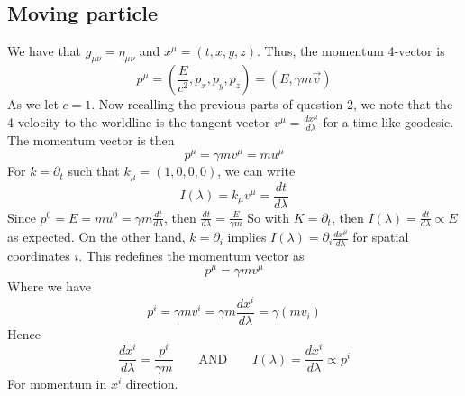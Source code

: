 \documentclass{article}
\begin{document}
		\subsection{Moving particle}
		We have that $g_{\mu\nu} = \eta_{\mu\nu}$ and $x^\mu = (t,x,y,z)$. Thus, the momentum 4-vector is
		$$ p^\mu = \left( \frac{E}{c^2}, p_x, p_y, p_z\right) = \left( E, \gamma m \vec{v}\right)$$
		As we let $c=1$. Now recalling the previous parts of question 2, we note that the 4 velocity to the worldline is the tangent vector $v^\mu = \frac{dx^\mu}{d\lambda}$ for a time-like geodesic. The momentum vector is then
		$$ p^\mu = \gamma m v^\mu = mu^\mu$$
		For $k = \partial_t $ such that $k_\mu = (1,0,0,0)$, we can write
		$$ I(\lambda) = k_\mu v^\mu = \frac{dt}{d\lambda}$$
		Since $p^0 = E = mu^0 = \gamma m \frac{dt}{d\lambda}$, then $\frac{dt}{d\lambda} = \frac{E}{\gamma m}$
		So with $K =\partial_t$, then $I(\lambda) = \frac{dt}{d\lambda} \propto E$ as expected.
		On the other hand, $k = \partial_i$ implies $I(\lambda) = \partial_i \frac{dx^\mu}{d\lambda}$ for spatial coordinates $i$. This redefines the momentum vector as
		$$ p^\mu = \gamma m v^\mu$$
		Where we have
		$$ p^i = \gamma m v^i = \gamma m \frac{dx^i}{d\lambda} = \gamma \left(m v_i\right)$$
		Hence
		$$ \frac{dx^i}{d\lambda} = \frac{p^i}{\gamma m} \quad\quad \text{AND} \quad\quad I(\lambda) = \frac{dx^i}{d\lambda}\propto p^i$$
		For momentum in $x^i$ direction.
	\pagebreak
\end{document}
